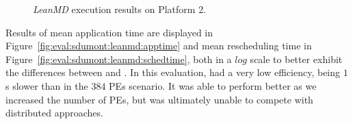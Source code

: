 \begin{figure}[t]
 \centering
 \caption{\textit{LeanMD} execution results on Platform 2.}
 \label{fig:eval:sdumont:leanmd}
\end{figure}



Results of mean application time are displayed in Figure~\ref{fig:eval:sdumont:leanmd:apptime} and mean rescheduling time in Figure~\ref{fig:eval:sdumont:leanmd:schedtime}, both in a $log$ scale to better exhibit the differences between \distributedlb and \packdrop.
In this evaluation,  had a very low efficiency, being $1$s slower than \greedylb in the $384$ PEs scenario.
It was able to perform better as we increased the number of PEs, but was ultimately unable to compete with distributed approaches.

